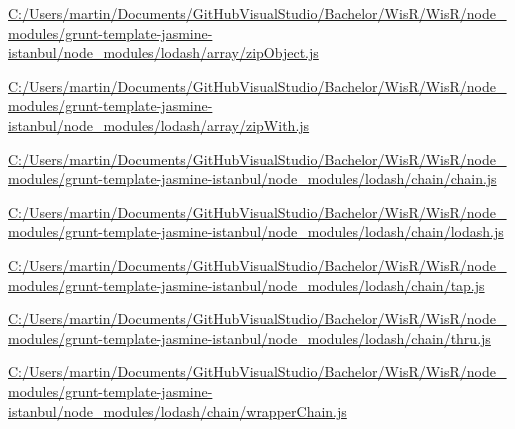 \begin{DoxyCompactItemize}
\item 
\hyperlink{_c_1_2_users_2martin_2_documents_2_git_hub_visual_studio_2_bachelor_2_wis_r_2_wis_r_2node_module4d2efefa184cd5623f6f2e30a4641b2f}{C\+:/\+Users/martin/\+Documents/\+Git\+Hub\+Visual\+Studio/\+Bachelor/\+Wis\+R/\+Wis\+R/node\+\_\+modules/grunt-\/template-\/jasmine-\/istanbul/node\+\_\+modules/lodash/array/zip\+Object.\+js}
\item 
\hyperlink{_c_1_2_users_2martin_2_documents_2_git_hub_visual_studio_2_bachelor_2_wis_r_2_wis_r_2node_modulee9eb2b8afccfb20541bd610ebce5c67e}{C\+:/\+Users/martin/\+Documents/\+Git\+Hub\+Visual\+Studio/\+Bachelor/\+Wis\+R/\+Wis\+R/node\+\_\+modules/grunt-\/template-\/jasmine-\/istanbul/node\+\_\+modules/lodash/array/zip\+With.\+js}
\item 
\hyperlink{_c_1_2_users_2martin_2_documents_2_git_hub_visual_studio_2_bachelor_2_wis_r_2_wis_r_2node_modulec6e9fc73fee8187b5268b6f4349f5b18}{C\+:/\+Users/martin/\+Documents/\+Git\+Hub\+Visual\+Studio/\+Bachelor/\+Wis\+R/\+Wis\+R/node\+\_\+modules/grunt-\/template-\/jasmine-\/istanbul/node\+\_\+modules/lodash/chain/chain.\+js}
\item 
\hyperlink{_c_1_2_users_2martin_2_documents_2_git_hub_visual_studio_2_bachelor_2_wis_r_2_wis_r_2node_moduleea2ca8f6e294c2cc90bf5b12039478ee}{C\+:/\+Users/martin/\+Documents/\+Git\+Hub\+Visual\+Studio/\+Bachelor/\+Wis\+R/\+Wis\+R/node\+\_\+modules/grunt-\/template-\/jasmine-\/istanbul/node\+\_\+modules/lodash/chain/lodash.\+js}
\item 
\hyperlink{_c_1_2_users_2martin_2_documents_2_git_hub_visual_studio_2_bachelor_2_wis_r_2_wis_r_2node_module6be375f056f9361be9351ce9fcbacd0f}{C\+:/\+Users/martin/\+Documents/\+Git\+Hub\+Visual\+Studio/\+Bachelor/\+Wis\+R/\+Wis\+R/node\+\_\+modules/grunt-\/template-\/jasmine-\/istanbul/node\+\_\+modules/lodash/chain/tap.\+js}
\item 
\hyperlink{_c_1_2_users_2martin_2_documents_2_git_hub_visual_studio_2_bachelor_2_wis_r_2_wis_r_2node_module4090764a1679b801906234dd3be71827}{C\+:/\+Users/martin/\+Documents/\+Git\+Hub\+Visual\+Studio/\+Bachelor/\+Wis\+R/\+Wis\+R/node\+\_\+modules/grunt-\/template-\/jasmine-\/istanbul/node\+\_\+modules/lodash/chain/thru.\+js}
\item 
\hyperlink{_c_1_2_users_2martin_2_documents_2_git_hub_visual_studio_2_bachelor_2_wis_r_2_wis_r_2node_modulefea2199cc00ae9a9d8cbf0f330e5554e}{C\+:/\+Users/martin/\+Documents/\+Git\+Hub\+Visual\+Studio/\+Bachelor/\+Wis\+R/\+Wis\+R/node\+\_\+modules/grunt-\/template-\/jasmine-\/istanbul/node\+\_\+modules/lodash/chain/wrapper\+Chain.\+js}

\end{DoxyCompactItemize}
